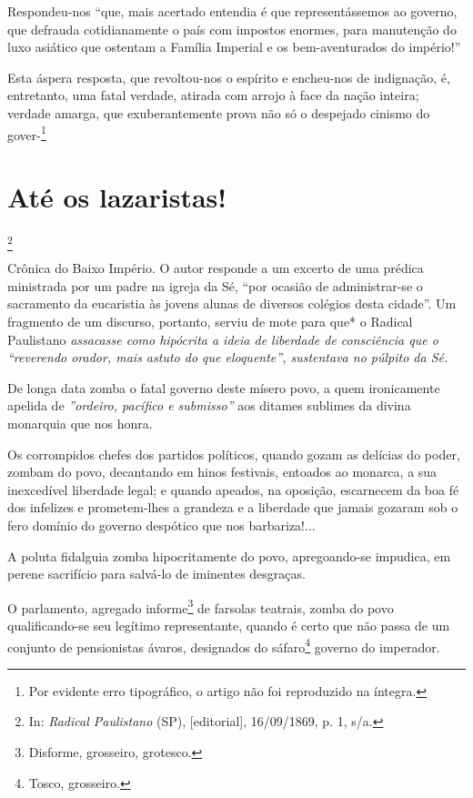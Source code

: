 Respondeu-nos ``que, mais acertado entendia é que representássemos ao
governo, que defrauda cotidianamente o país com impostos enormes, para
manutenção do luxo asiático que ostentam a Família Imperial e os
bem-aventurados do império!''

Esta áspera resposta, que revoltou-nos o espírito e encheu-nos de
indignação, é, entretanto, uma fatal verdade, atirada com arrojo à face
da nação inteira; verdade amarga, que exuberantemente prova não só o
despejado cinismo do gover-\footnote{Por evidente erro tipográfico, o
  artigo não foi reproduzido na íntegra.}

\chapter{Até os lazaristas!}\footnote{In: \emph{Radical Paulistano} (SP),
  {[}editorial{]}, 16/09/1869, p. 1, s/a.}

\begin{didascalia}
Crônica do Baixo Império. O autor responde a um excerto de uma prédica
ministrada por um padre na igreja da Sé, ``por ocasião de administrar-se
o sacramento da eucaristia às jovens alunas de diversos colégios desta
cidade''. Um fragmento de um discurso, portanto, serviu de mote para que*
o Radical Paulistano \emph{assacasse como hipócrita a ideia de liberdade
de consciência que o ``reverendo orador, mais astuto do que eloquente'',
sustentava no púlpito da Sé.}
\end{didascalia}

\asterisc{}

De longa data zomba o fatal governo deste mísero povo, a quem
ironicamente apelida de \emph{''ordeiro, pacífico e submisso''} aos
ditames sublimes da divina monarquia que nos honra.

Os corrompidos chefes dos partidos políticos, quando gozam as delícias
do poder, zombam do povo, decantando em hinos festivais, entoados ao
monarca, a sua inexcedível liberdade legal; e quando apeados, na
oposição, escarnecem da boa fé dos infelizes e prometem-lhes a grandeza
e a liberdade que jamais gozaram sob o fero domínio do governo despótico
que nos barbariza!...

A poluta fidalguia zomba hipocritamente do povo, apregoando-se impudica,
em perene sacrifício para salvá-lo de iminentes desgraças.

O parlamento, agregado informe\footnote{Disforme, grosseiro, grotesco.}
de farsolas teatrais, zomba do povo qualificando-se seu legítimo
representante, quando é certo que não passa de um conjunto de
pensionistas ávaros, designados do sáfaro\footnote{Tosco, grosseiro.}
governo do imperador.

